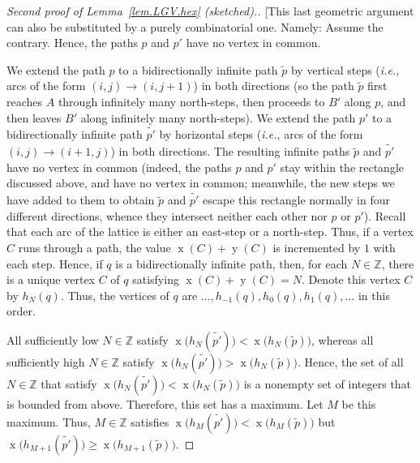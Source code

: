 \documentclass[reqno]{amsart}
\newcommand{\0}{\phantom{c}}
\DeclareMathOperator{\xcoord}{x} %
\DeclareMathOperator{\ycoord}{y} %
\newcommand{\ZZ}{\mathbb{Z}}
\newenvironment{verlong}{}{}
\theoremstyle{plain}
\theoremstyle{definition}
\numberwithin{equation}{section}
\begin{document}
\begin{verlong}
\begin{proof}[Second proof of Lemma~\ref{lem.LGV.hex} (sketched).]
[This last geometric argument can also be substituted by a purely combinatorial one.
Namely: Assume the contrary. Hence, the paths $p$ and $p'$ have no vertex in common.

We extend the path $p$ to a bidirectionally infinite path $\widetilde{p}$ by vertical steps (\textit{i.e.}, arcs of the form $(i,j) \to (i,j+1)$) in both directions (so the path $\widetilde{p}$ first reaches $A$ through infinitely many north-steps, then proceeds to $B'$ along $p$, and then leaves $B'$ along infinitely many north-steps).
We extend the path $p'$ to a bidirectionally infinite path $\widetilde{p'}$ by horizontal steps (\textit{i.e.}, arcs of the form $(i,j) \to (i+1,j)$) in both directions.
The resulting infinite paths $\widetilde{p}$ and $\widetilde{p'}$ have no vertex in common (indeed, the paths $p$ and $p'$ stay within the rectangle discussed above, and have no vertex in common; meanwhile, the new
steps we have added to them to obtain $\widetilde{p}$ and $\widetilde{p'}$ escape this rectangle normally in four different directions, whence they intersect neither each other nor $p$ or $p'$).
Recall that each arc of the lattice is either an east-step or a north-step.
Thus, if a vertex $C$ runs through a path, the value $\xcoord(C) + \ycoord(C)$ is incremented by $1$ with each step.
Hence, if $q$ is a bidirectionally infinite path, then, for each $N \in \ZZ$, there is a unique vertex $C$ of $q$ satisfying $\xcoord(C) + \ycoord(C) = N$.
Denote this vertex $C$ by $h_N(q)$.
Thus, the vertices of $q$ are $\ldots, h_{-1}(q), h_{0}(q), h_1(q), \ldots$ in this order.

All sufficiently low $N \in \ZZ$ satisfy $\xcoord\bigl( h_N(\widetilde{p'}) \bigr) < \xcoord\bigl( h_N(\widetilde{p}) \bigr)$, whereas all sufficiently high $N \in \ZZ$ satisfy $\xcoord\bigl( h_N(\widetilde{p'}) \bigr) > \xcoord\bigl( h_N(\widetilde{p}) \bigr)$.
Hence, the set of all $N \in \ZZ$ that satisfy $\xcoord\bigl( h_N(\widetilde{p'}) \bigr) < \xcoord\bigl( h_N(\widetilde{p}) \bigr)$ is a nonempty set of integers that is bounded from above.
Therefore, this set has a maximum.
Let $M$ be this maximum.
Thus, $M \in \ZZ$ satisfies $\xcoord\bigl( h_{M}(\widetilde{p'}) \bigr) < \xcoord\bigl( h_{M}(\widetilde{p}) \bigr)$ but $\xcoord\bigl( h_{M+1}(\widetilde{p'}) \bigr) \geq \xcoord\bigl( h_{M+1}(\widetilde{p}) \bigr)$.


\end{proof}
\end{verlong}
\end{document}
